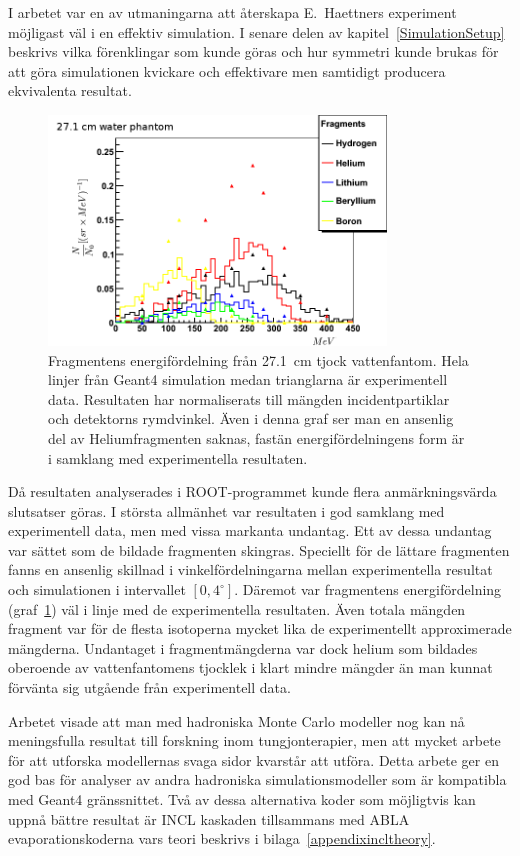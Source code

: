 I arbetet var en av utmaningarna att återskapa E.~Haettners experiment möjligast väl i en effektiv simulation. I senare delen av kapitel~\ref{SimulationSetup} beskrivs vilka förenklingar som kunde göras och hur symmetri kunde brukas för att göra simulationen kvickare och effektivare men samtidigt producera ekvivalenta resultat.
\begin{figure}[!h] 
\begin{center}
\includegraphics[width=0.8\textwidth]{images/plots/fragmentEnergy/fragmentEnergyDistr.png}  
\caption{\label{fragmentEnergySvenska}Fragmentens energifördelning från 27.1~cm tjock vattenfantom. Hela linjer från Geant4 simulation medan trianglarna är experimentell data. Resultaten har normaliserats till mängden incidentpartiklar och detektorns rymdvinkel. Även i denna graf ser man en ansenlig del av Heliumfragmenten saknas, fastän energifördelningens form är i samklang med experimentella resultaten.}
\end{center}
\end{figure}

Då resultaten analyserades i ROOT-programmet kunde flera anmärkningsvärda slutsatser göras. I största allmänhet var resultaten i god samklang med experimentell data, men med vissa markanta undantag. Ett av dessa undantag var sättet som de bildade fragmenten skingras. Speciellt för de lättare fragmenten fanns en ansenlig skillnad i vinkelfördelningarna mellan experimentella resultat och simulationen i intervallet $[0,4^\circ]$. Däremot var fragmentens energifördelning (graf~\ref{fragmentEnergySvenska}) väl i linje med de experimentella resultaten. Även totala mängden fragment var för de flesta isotoperna mycket lika de experimentellt approximerade mängderna. Undantaget i fragmentmängderna var dock helium som bildades oberoende av vattenfantomens tjocklek i klart mindre mängder än man kunnat förvänta sig utgående från experimentell data.

Arbetet visade att man med hadroniska Monte Carlo modeller nog kan nå meningsfulla resultat till forskning inom tungjonterapier, men att mycket arbete för att utforska modellernas svaga sidor kvarstår att utföra. Detta arbete ger en god bas för analyser av andra hadroniska simulationsmodeller som är kompatibla med Geant4 gränssnittet. Två av dessa alternativa koder som möjligtvis kan uppnå bättre resultat är INCL kaskaden tillsammans med ABLA evaporationskoderna vars teori beskrivs i bilaga~\ref{appendixincltheory}.



